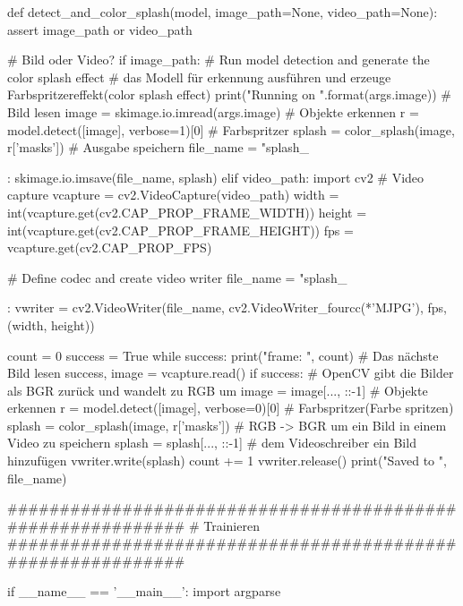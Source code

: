 def detect_and_color_splash(model, image_path=None, video_path=None):
    assert image_path or video_path

    # Bild oder Video?
    if image_path:
        # Run model detection and generate the color splash effect
        # das Modell für erkennung ausführen und erzeuge Farbspritzereffekt(color splash effect)
        print("Running on {}".format(args.image))
        # Bild lesen
        image = skimage.io.imread(args.image)
        #  Objekte erkennen
        r = model.detect([image], verbose=1)[0]
        # Farbspritzer
        splash = color_splash(image, r['masks'])
        # Ausgabe speichern 
        file_name = "splash_{:%
        skimage.io.imsave(file_name, splash)
    elif video_path:
        import cv2
        # Video capture
        vcapture = cv2.VideoCapture(video_path)
        width = int(vcapture.get(cv2.CAP_PROP_FRAME_WIDTH))
        height = int(vcapture.get(cv2.CAP_PROP_FRAME_HEIGHT))
        fps = vcapture.get(cv2.CAP_PROP_FPS)

        # Define codec and create video writer
        file_name = "splash_{:%
        vwriter = cv2.VideoWriter(file_name,
                                  cv2.VideoWriter_fourcc(*'MJPG'),
                                  fps, (width, height))

        count = 0
        success = True
        while success:
            print("frame: ", count)
            # Das nächste Bild lesen
            success, image = vcapture.read()
            if success:
                # OpenCV gibt die Bilder als BGR zurück und wandelt zu RGB um 
                image = image[..., ::-1]
                # Objekte erkennen
                r = model.detect([image], verbose=0)[0]
                # Farbspritzer(Farbe spritzen)
                splash = color_splash(image, r['masks'])
                # RGB -> BGR um ein Bild in einem Video zu speichern
                splash = splash[..., ::-1]
                # dem Videoschreiber ein Bild hinzufügen
                vwriter.write(splash)
                count += 1
        vwriter.release()
    print("Saved to ", file_name)


############################################################
#  Trainieren
############################################################

if __name__ == '__main__':
    import argparse

}}
